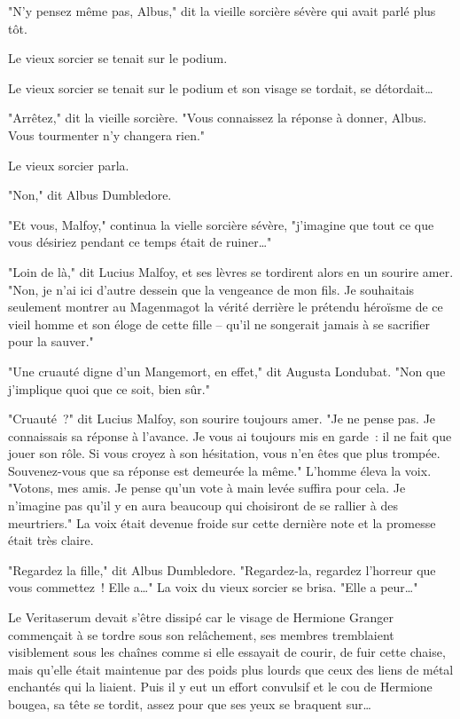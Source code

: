 "N'y pensez même pas, Albus," dit la vieille sorcière sévère qui avait parlé plus tôt.

Le vieux sorcier se tenait sur le podium.

Le vieux sorcier se tenait sur le podium et son visage se tordait, se détordait…

"Arrêtez," dit la vieille sorcière. "Vous connaissez la réponse à donner, Albus. Vous tourmenter n'y changera rien."

Le vieux sorcier parla.

"Non," dit Albus Dumbledore.

"Et vous, Malfoy," continua la vielle sorcière sévère, "j'imagine que tout ce que vous désiriez pendant ce temps était de ruiner…"

"Loin de là," dit Lucius Malfoy, et ses lèvres se tordirent alors en un sourire amer. "Non, je n'ai ici d'autre dessein que la vengeance de mon fils. Je souhaitais seulement montrer au Magenmagot la vérité derrière le prétendu héroïsme de ce vieil homme et son éloge de cette fille -- qu'il ne songerait jamais à se sacrifier pour la sauver."

"Une cruauté digne d'un Mangemort, en effet," dit Augusta Londubat. "Non que j'implique quoi que ce soit, bien sûr."

"Cruauté~?" dit Lucius Malfoy, son sourire toujours amer. "Je ne pense pas. Je connaissais sa réponse à l'avance. Je vous ai toujours mis en garde~: il ne fait que jouer son rôle. Si vous croyez à son hésitation, vous n'en êtes que plus trompée. Souvenez-vous que sa réponse est demeurée la même." L'homme éleva la voix. "Votons, mes amis. Je pense qu'un vote à main levée suffira pour cela. Je n'imagine pas qu'il y en aura beaucoup qui choisiront de se rallier à des meurtriers." La voix était devenue froide sur cette dernière note et la promesse était très claire.

"Regardez la fille," dit Albus Dumbledore. "Regardez-la, regardez l'horreur que vous commettez~! Elle a…" La voix du vieux sorcier se brisa. "Elle a peur…"

Le Veritaserum devait s'être dissipé car le visage de Hermione Granger commençait à se tordre sous son relâchement, ses membres tremblaient visiblement sous les chaînes comme si elle essayait de courir, de fuir cette chaise, mais qu'elle était maintenue par des poids plus lourds que ceux des liens de métal enchantés qui la liaient. Puis il y eut un effort convulsif et le cou de Hermione bougea, sa tête se tordit, assez pour que ses yeux se braquent sur…

